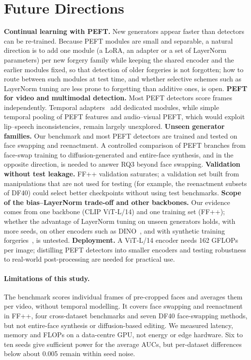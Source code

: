 \documentclass[fonts]{icst}
\begin{document}
\section{Future Directions}
\label{sec:open}
\textbf{Continual learning with PEFT.} New generators appear faster than detectors can be re-trained. Because PEFT modules are small and separable, a natural direction is to add one module (a LoRA, an adapter or a set of LayerNorm parameters) per new forgery family while keeping the shared encoder and the earlier modules fixed, so that detection of older forgeries is not forgotten; how to route between such modules at test time, and whether selective schemes such as LayerNorm tuning are less prone to forgetting than additive ones, is open.
\textbf{PEFT for video and multimodal detection.} Most PEFT detectors score frames independently. Temporal adapters~\cite{han2024fcg} add dedicated modules, while simple temporal pooling of PEFT features and audio--visual PEFT, which would exploit lip--speech inconsistencies, remain largely unexplored.
\textbf{Unseen generator families.} Our benchmark and most PEFT detectors are trained and tested on face swapping and reenactment. A controlled comparison of PEFT branches from face-swap training to diffusion-generated and entire-face synthesis, and in the opposite direction, is needed to answer RQ3 beyond face swapping.
\textbf{Validation without test leakage.} FF++ validation saturates; a validation set built from manipulations that are not used for testing (for example, the reenactment subsets of DF40) could select better checkpoints without using test benchmarks.
\textbf{Scope of the bias--LayerNorm trade-off and other backbones.} Our evidence comes from one backbone (CLIP ViT-L/14) and one training set (FF++); whether the advantage of LayerNorm tuning on unseen generators holds, with more seeds, on other encoders such as DINO~\cite{caron2021emerging}, and with synthetic training forgeries~\cite{shiohara2022sbi}, is untested.
\textbf{Deployment.} A ViT-L/14 encoder needs 162 GFLOPs per image; distilling PEFT detectors into smaller encoders and testing robustness to real-world post-processing are needed for practical use.

\paragraph{Limitations of this study.}\label{sec:limits} The benchmark scores individual frames of pre-cropped faces and averages them per video, without temporal modelling. It covers face swapping and reenactment in FF++, four cross-dataset benchmarks and seven DF40 face-swapping methods, but not entire-face synthesis or diffusion-based editing. We measured latency, memory and FLOPs on a data-centre GPU, not energy or edge hardware. Six to ten seeds give sufficient power for the average AUCs, but per-dataset differences below about 0.005 remain within seed noise.
\end{document}
